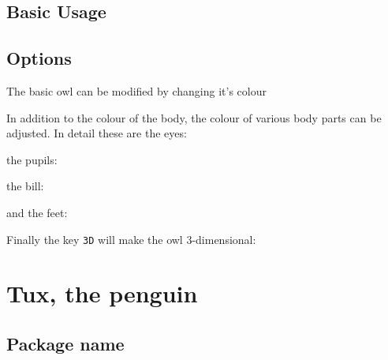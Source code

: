 \documentclass[parskip=half]{scrartcl}
\begin{document}
\subsection{Basic Usage}

\begin{tcblisting}{}
\owl
\end{tcblisting}

\subsection{Options}

The basic owl can be modified by changing it's colour

\begin{tcblisting}{}
\owl[body=SteelBlue]
\end{tcblisting}

In addition to the colour of the body, the colour of various body parts can be adjusted. In detail these are the eyes:

\begin{tcblisting}{}
\owl[eye=red]
\end{tcblisting}

the pupils:

\begin{tcblisting}{}
\owl[pupil=red]
\end{tcblisting}

the bill:

\begin{tcblisting}{}
\owl[bill=red]
\end{tcblisting}

and the feet:

\begin{tcblisting}{}
\owl[feet=red]
\end{tcblisting}

Finally the key \lstinline|3D| will make the owl 3-dimensional:

\begin{tcblisting}{}
\owl[3D]
\end{tcblisting}


\clearpage
\section[Penguin]{Tux, the penguin}

\subsection{Package name}
\end{document}
